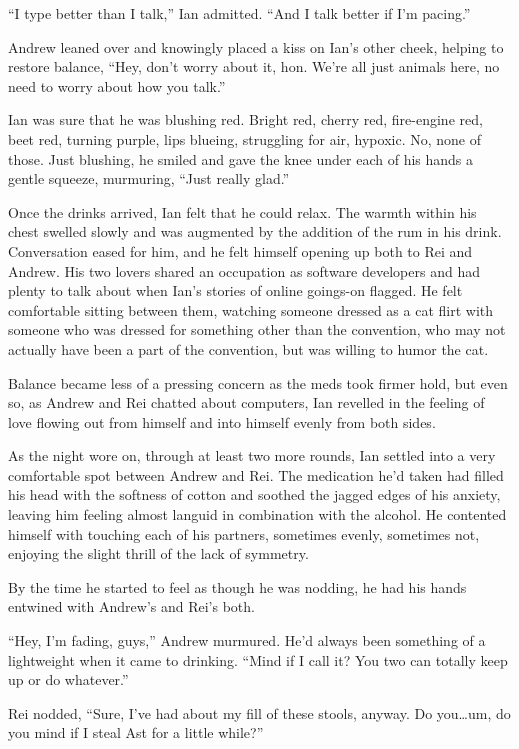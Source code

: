 ``I type better than I talk,'' Ian admitted. ``And I talk better if I'm pacing.''

Andrew leaned over and knowingly placed a kiss on Ian's other cheek, helping to restore balance, ``Hey, don't worry about it, hon. We're all just animals here, no need to worry about how you talk.''

Ian was sure that he was blushing red. Bright red, cherry red, fire-engine red, beet red, turning purple, lips blueing, struggling for air, hypoxic. No, none of those. Just blushing, he smiled and gave the knee under each of his hands a gentle squeeze, murmuring, ``Just really glad.''

Once the drinks arrived, Ian felt that he could relax. The warmth within his chest swelled slowly and was augmented by the addition of the rum in his drink. Conversation eased for him, and he felt himself opening up both to Rei and Andrew. His two lovers shared an occupation as software developers and had plenty to talk about when Ian's stories of online goings-on flagged. He felt comfortable sitting between them, watching someone dressed as a cat flirt with someone who was dressed for something other than the convention, who may not actually have been a part of the convention, but was willing to humor the cat.

Balance became less of a pressing concern as the meds took firmer hold, but even so, as Andrew and Rei chatted about computers, Ian revelled in the feeling of love flowing out from himself and into himself evenly from both sides.

\secdiv

As the night wore on, through at least two more rounds, Ian settled into a very comfortable spot between Andrew and Rei. The medication he'd taken had filled his head with the softness of cotton and soothed the jagged edges of his anxiety, leaving him feeling almost languid in combination with the alcohol. He contented himself with touching each of his partners, sometimes evenly, sometimes not, enjoying the slight thrill of the lack of symmetry.

By the time he started to feel as though he was nodding, he had his hands entwined with Andrew's and Rei's both.

``Hey, I'm fading, guys,'' Andrew murmured. He'd always been something of a lightweight when it came to drinking. ``Mind if I call it? You two can totally keep up or do whatever.''

Rei nodded, ``Sure, I've had about my fill of these stools, anyway. Do you\ldots{}um, do you mind if I steal Ast for a little while?''

